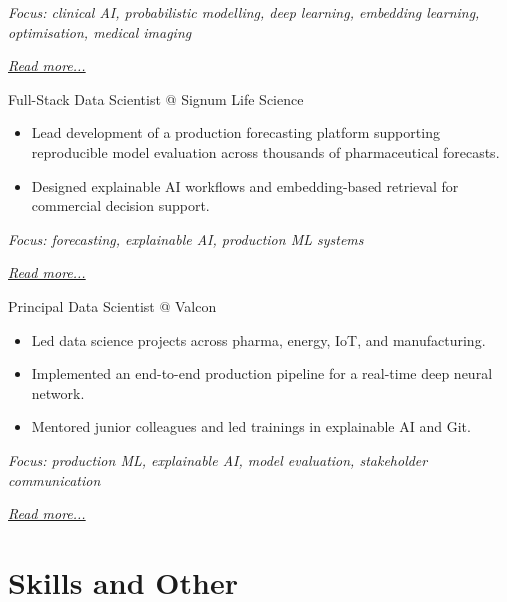 \documentclass[11pt,a4paper]{moderncv}
\begin{document}
{\footnotesize\textit{Focus: clinical AI, probabilistic modelling, deep learning, embedding learning, optimisation, medical imaging}}

\hfill{\small{\textit{\hyperref[sec:raysearch]{Read more...}}}}

\large{Full-Stack Data Scientist @ Signum Life Science}
\normalsize
\begin{itemize}
\item Lead development of a production forecasting platform supporting reproducible model evaluation across thousands of pharmaceutical forecasts.
\item Designed explainable AI workflows and embedding-based retrieval for commercial decision support.
\end{itemize}

{\footnotesize\textit{Focus: forecasting, explainable AI, production ML systems}}

\hfill{\small{\textit{\hyperref[sec:signum]{Read more...}}}}

\large{Principal Data Scientist @ Valcon}
\normalsize
\begin{itemize}
\item Led data science projects across pharma, energy, IoT, and manufacturing.
\item Implemented an end-to-end production pipeline for a real-time deep neural network.
\item Mentored junior colleagues and led trainings in explainable AI and Git.
\end{itemize}

{\footnotesize\textit{Focus: production ML, explainable AI, model evaluation, stakeholder communication}}

\hfill{\small{\textit{\hyperref[sec:valcon]{Read more...}}}}

\section{Skills and Other}
\normalsize
{}
\end{document}

